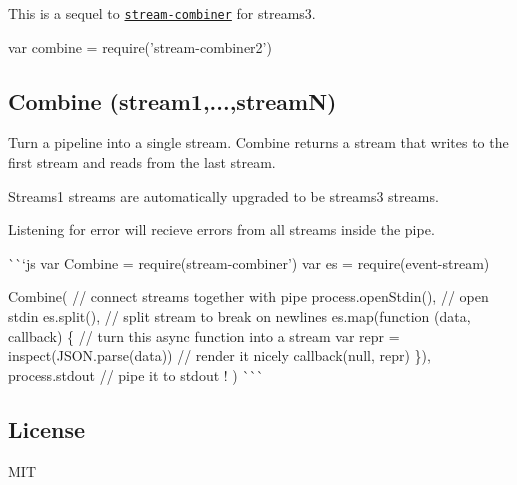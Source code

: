 This is a sequel to \href{https://npmjs.org/package/stream-combiner}{\tt stream-\/combiner} for streams3.


\begin{DoxyCode}
var combine = require('stream-combiner2')
\end{DoxyCode}


\subsection*{Combine (stream1,...,streamN)}

Turn a pipeline into a single stream. {\ttfamily Combine} returns a stream that writes to the first stream and reads from the last stream.

Streams1 streams are automatically upgraded to be streams3 streams.

Listening for \textquotesingle{}error\textquotesingle{} will recieve errors from all streams inside the pipe.

\`{}\`{}`js var Combine = require(\textquotesingle{}stream-\/combiner') var es = require(\textquotesingle{}event-\/stream\textquotesingle{})

Combine( // connect streams together with {\ttfamily pipe} process.\+open\+Stdin(), // open stdin es.\+split(), // split stream to break on newlines es.\+map(function (data, callback) \{ // turn this async function into a stream var repr = inspect(J\+S\+O\+N.\+parse(data)) // render it nicely callback(null, repr) \}), process.\+stdout // pipe it to stdout ! ) \`{}\`{}\`{}

\subsection*{License}

M\+IT 